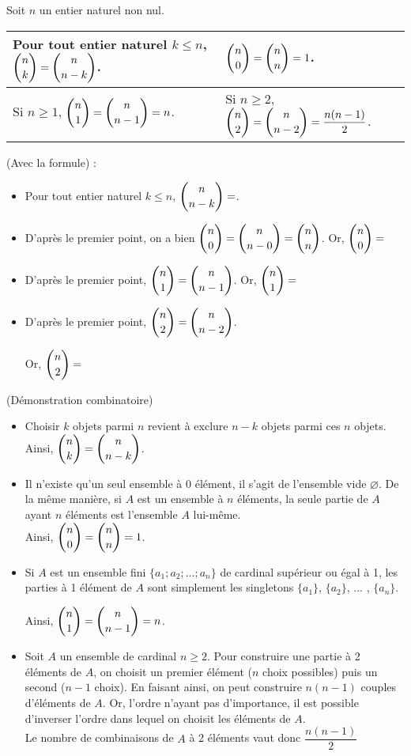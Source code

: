 \documentclass[11pt,fleqn, openany]{book} %
\begin{document}
\begin{proposition} Soit $n$ un entier naturel non nul. 

\begin{tabularx}{\linewidth}{X|X}
Pour tout entier naturel $k \leqslant n$, $\dbinom{n}{k}=\dbinom{n}{n-k}$. & $\dbinom{n}{0}=\dbinom{n}{n}=1$. \\
\hline
Si $n\geqslant 1$, $\dbinom{n}{1}=\dbinom{n}{n-1}=n$. & Si $n\geqslant 2$, $\dbinom{n}{2}=\dbinom{n}{n-2}=\dfrac{n(n-1)}{2}$.
\end{tabularx}

\end{proposition}

\begin{demonstration} (Avec la formule) :
\begin{itemize}
\item Pour tout entier naturel $k\leqslant n$, $\dbinom{n}{n-k}=$.
\vskip10pt
\item D'après le premier point, on a bien $\dbinom{n}{0}=\dbinom{n}{n-0}=\dbinom{n}{n}$. Or, $\dbinom{n}{0}=$
\vskip10pt
\item D'après le premier point,  $\dbinom{n}{1}=\dbinom{n}{n-1}$. Or, $\dbinom{n}{1}=$
\vskip10pt
\item D'après le premier point,  $\dbinom{n}{2}=\dbinom{n}{n-2}$.

 Or, $\dbinom{n}{2}=$
\end{itemize}\end{demonstration}






\begin{demonstration} (Démonstration combinatoire)

\begin{itemize}
\item Choisir $k$ objets parmi $n$ revient à exclure $n-k$ objets parmi ces $n$ objets. Ainsi, $\dbinom{n}{k}=\dbinom{n}{n-k}$.
\item Il n'existe qu'un seul ensemble à 0 élément, il s'agit de l'ensemble vide $\varnothing$. De la même manière, si $A$ est un ensemble à $n$ éléments, la seule partie de $A$ ayant $n$ éléments est l'ensemble $A$ lui-même.\\  Ainsi, $\dbinom{n}{0}=\dbinom{n}{n}=1$.
\item Si $A$ est un ensemble fini $\{a_1;a_2;\ldots ;a_n\}$ de cardinal supérieur ou égal à 1, les parties à 1 élément de $A$ sont simplement les singletons $\{ a_1\}$, $\{a_2\}$, ... , $\{a_n\}$. 

Ainsi, $\dbinom{n}{1}=\dbinom{n}{n-1}=n$.
\item Soit $A$ un ensemble de cardinal $n\geqslant 2$. Pour construire une partie à 2 éléments de $A$, on choisit un premier élément ($n$ choix possibles) puis un second ($n-1$ choix). En faisant ainsi, on peut construire $n(n-1)$ couples d'éléments de $A$. Or, l'ordre n'ayant pas d'importance, il est possible d'inverser l'ordre dans lequel on choisit les éléments de $A$. \\ Le nombre de combinaisons de $A$ à 2 éléments vaut donc $\dfrac{n(n-1)}{2}$
\end{itemize}\end{demonstration}
\end{document}
